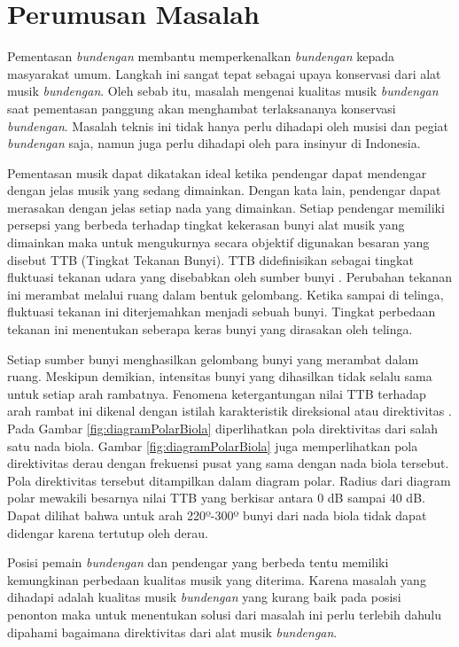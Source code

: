 \section{Perumusan Masalah}\label{subBab:rumusanMasalah}
Pementasan \textit{bundengan} membantu memperkenalkan \textit{bundengan} kepada masyarakat umum. Langkah ini sangat tepat sebagai upaya konservasi dari alat musik \textit{bundengan}. Oleh sebab itu, masalah mengenai kualitas musik \textit{bundengan} saat pementasan panggung akan menghambat terlaksananya konservasi \textit{bundengan}. Masalah teknis ini tidak hanya perlu dihadapi oleh musisi dan pegiat \textit{bundengan} saja, namun juga perlu dihadapi oleh para insinyur di Indonesia. \par 
Pementasan musik dapat dikatakan ideal ketika pendengar dapat mendengar dengan jelas musik yang sedang dimainkan. Dengan kata lain, pendengar dapat merasakan dengan jelas setiap nada yang dimainkan. Setiap pendengar memiliki persepsi yang berbeda terhadap tingkat kekerasan bunyi alat musik yang dimainkan maka untuk mengukurnya secara objektif digunakan besaran yang disebut TTB (Tingkat Tekanan Bunyi). TTB didefinisikan sebagai tingkat fluktuasi tekanan udara yang disebabkan oleh sumber bunyi \cite{meyer}. Perubahan tekanan ini merambat melalui ruang dalam bentuk gelombang. Ketika sampai di telinga, fluktuasi tekanan ini diterjemahkan menjadi sebuah bunyi. Tingkat perbedaan tekanan ini menentukan seberapa keras bunyi yang dirasakan oleh telinga. \par 
Setiap sumber bunyi menghasilkan gelombang bunyi yang merambat dalam ruang. Meskipun demikian, intensitas bunyi yang dihasilkan tidak selalu sama untuk setiap arah rambatnya. Fenomena ketergantungan nilai TTB terhadap arah rambat ini dikenal dengan istilah karakteristik direksional atau direktivitas \cite{meyer}. Pada Gambar \ref{fig:diagramPolarBiola} diperlihatkan pola direktivitas dari salah satu nada biola. Gambar \ref{fig:diagramPolarBiola} juga memperlihatkan pola direktivitas derau dengan frekuensi pusat yang sama dengan nada biola tersebut. Pola direktivitas tersebut ditampilkan dalam diagram polar. Radius dari diagram polar mewakili besarnya nilai TTB yang berkisar antara 0 dB sampai 40 dB. Dapat dilihat bahwa untuk arah 220º-300º bunyi dari nada biola tidak dapat didengar karena tertutup oleh derau. \par 
Posisi pemain \textit{bundengan} dan pendengar yang berbeda tentu memiliki kemungkinan perbedaan kualitas musik yang diterima. Karena masalah yang dihadapi adalah kualitas musik \textit{bundengan} yang kurang baik pada posisi penonton maka untuk menentukan solusi dari masalah ini perlu terlebih dahulu dipahami bagaimana direktivitas dari alat musik \textit{bundengan}. \par 

